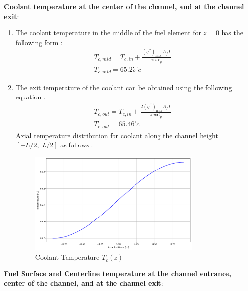 \documentclass[12pt]{article}
\begin{document}
\textbf{Coolant temperature at the center of the channel, and at the channel exit}:

\begin{enumerate}
    \item The coolant temperature in the middle of the fuel element for $z=0$ has the following form \cite{popov2017th}:
    \begin{equation}
    \begin{gathered}
        T_{c, mid}=T_{c,i n}+\frac{\left(q^{\mathrm{\prime \prime }}\right)_{\mathrm{max~}}A_{f}L}{\pi\,w c_{p}} \\
        T_{c, mid} = \boxed{65.23 ^{\circ} c}
    \end{gathered}
    \end{equation}
    \item The exit temperature of the coolant can be obtained using the following equation \cite{popov2017th}:
    \begin{equation}
        \begin{gathered}
            T_{c,o u t}=T_{c,i n}+{\frac{2\left(q^{\prime \prime }\right)_{\mathrm{max}}A_{f}L}{\pi\,w C_{p}}} \\
            T_{c,o u t}= \boxed{65.46 ^{\circ} c}
        \end{gathered}
    \end{equation}
Axial temperature distribution for coolant along the channel height $[-L/2, \;L/2]$ as follows :

\begin{figure}[h!]
\centering
    \includegraphics[width=0.8\textwidth]{axial_temperature_distribution.png}
    \caption{Coolant Temperature $T_c(z)$}
    \label{1}
\end{figure}
    
\end{enumerate}

\textbf{Fuel Surface and Centerline temperature at the channel entrance, center of the channel, and at the channel exit}:
\end{document}
